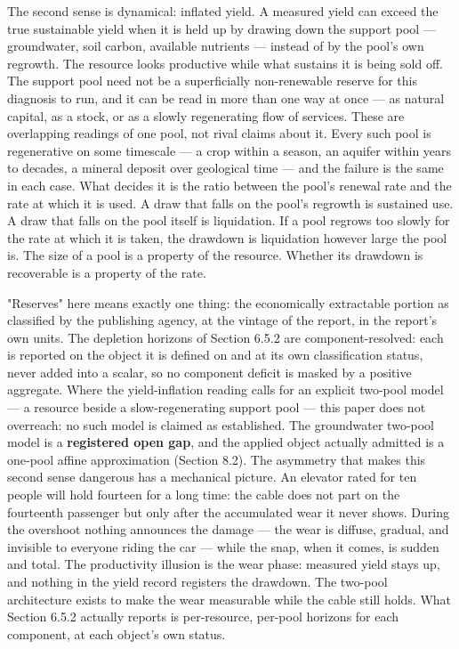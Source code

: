\documentclass[11pt]{article}
\begin{document}
The second sense is dynamical: inflated yield. A measured yield can exceed the true sustainable yield when it is held up by drawing down the support pool --- groundwater, soil carbon, available nutrients --- instead of by the pool's own regrowth. The resource looks productive while what sustains it is being sold off. The support pool need not be a superficially non-renewable reserve for this diagnosis to run, and it can be read in more than one way at once --- as natural capital, as a stock, or as a slowly regenerating flow of services. These are overlapping readings of one pool, not rival claims about it. Every such pool is regenerative on some timescale --- a crop within a season, an aquifer within years to decades, a mineral deposit over geological time --- and the failure is the same in each case. What decides it is the ratio between the pool's renewal rate and the rate at which it is used. A draw that falls on the pool's regrowth is sustained use. A draw that falls on the pool itself is liquidation. If a pool regrows too slowly for the rate at which it is taken, the drawdown is liquidation however large the pool is. The size of a pool is a property of the resource. Whether its drawdown is recoverable is a property of the rate.

"Reserves" here means exactly one thing: the economically extractable portion as classified by the publishing agency, at the vintage of the report, in the report's own units. The depletion horizons of Section 6.5.2 are component-resolved: each is reported on the object it is defined on and at its own classification status, never added into a scalar, so no component deficit is masked by a positive aggregate. Where the yield-inflation reading calls for an explicit two-pool model --- a resource beside a slow-regenerating support pool --- this paper does not overreach: no such model is claimed as established. The groundwater two-pool model is a \textbf{registered open gap}, and the applied object actually admitted is a one-pool affine approximation (Section 8.2). The asymmetry that makes this second sense dangerous has a mechanical picture. An elevator rated for ten people will hold fourteen for a long time: the cable does not part on the fourteenth passenger but only after the accumulated wear it never shows. During the overshoot nothing announces the damage --- the wear is diffuse, gradual, and invisible to everyone riding the car --- while the snap, when it comes, is sudden and total. The productivity illusion is the wear phase: measured yield stays up, and nothing in the yield record registers the drawdown. The two-pool architecture exists to make the wear measurable while the cable still holds. What Section 6.5.2 actually reports is per-resource, per-pool horizons for each component, at each object's own status.
\end{document}
